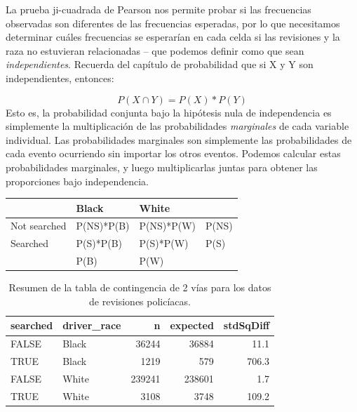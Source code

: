 \documentclass[
  12pt,
]{book}
\begin{document}
La prueba ji-cuadrada de Pearson nos permite probar si las frecuencias observadas son diferentes de las frecuencias esperadas, por lo que necesitamos determinar cuáles frecuencias se esperarían en cada celda si las revisiones y la raza no estuvieran relacionadas -- que podemos definir como que sean \emph{independientes}. Recuerda del capítulo de probabilidad que si X y Y son independientes, entonces:

\[
P(X \cap Y) = P(X) * P(Y)
\]
Esto es, la probabilidad conjunta bajo la hipótesis nula de independencia es simplemente la multiplicación de las probabilidades \emph{marginales} de cada variable individual. Las probabilidades marginales son simplemente las probabilidades de cada evento ocurriendo sin importar los otros eventos. Podemos calcular estas probabilidades marginales, y luego multiplicarlas juntas para obtener las proporciones bajo independencia.

\begin{longtable}[]{@{}llll@{}}
\toprule
& Black & White & \\
\midrule
\endhead
Not searched & P(NS)*P(B) & P(NS)*P(W) & P(NS) \\
Searched & P(S)*P(B) & P(S)*P(W) & P(S) \\
& P(B) & P(W) & \\
\bottomrule
\end{longtable}

\begin{table}

\caption{\label{tab:unnamed-chunk-80}Resumen de la tabla de contingencia de 2 vías para los datos de revisiones policíacas.}
\centering
\begin{tabular}[t]{l|l|r|r|r}
\hline
searched & driver\_race & n & expected & stdSqDiff\\
\hline
FALSE & Black & 36244 & 36884 & 11.1\\
\hline
TRUE & Black & 1219 & 579 & 706.3\\
\hline
FALSE & White & 239241 & 238601 & 1.7\\
\hline
TRUE & White & 3108 & 3748 & 109.2\\
\hline
\end{tabular}
\end{table}
\end{document}
